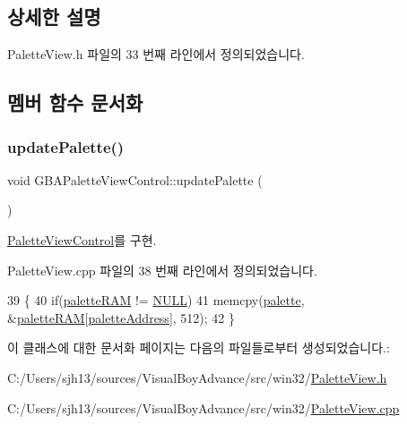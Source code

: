 \subsection{상세한 설명}


Palette\+View.\+h 파일의 33 번째 라인에서 정의되었습니다.



\subsection{멤버 함수 문서화}
\mbox{\label{class_g_b_a_palette_view_control_a020d7db2f3efb69b4e08d1b5fb351850}} 
\subsubsection{\texorpdfstring{update\+Palette()}{updatePalette()}}
{\footnotesize\ttfamily void G\+B\+A\+Palette\+View\+Control\+::update\+Palette (\begin{DoxyParamCaption}{ }\end{DoxyParamCaption})\hspace{0.3cm}{\ttfamily [virtual]}}



\mbox{\hyperlink{class_palette_view_control_a12772d59f8e890a920cb200d2f6a4b7a}{Palette\+View\+Control}}를 구현.



Palette\+View.\+cpp 파일의 38 번째 라인에서 정의되었습니다.


\begin{DoxyCode}
39 \{
40   \textcolor{keywordflow}{if}(\mbox{\hyperlink{_globals_8cpp_aea0283719ad27328f3cf5f883f58813e}{paletteRAM}} != \mbox{\hyperlink{getopt1_8c_a070d2ce7b6bb7e5c05602aa8c308d0c4}{NULL}})
41     memcpy(\mbox{\hyperlink{class_palette_view_control_a1a5ce1812cf6c8d26889f4eb03d1d4ec}{palette}}, &\mbox{\hyperlink{_globals_8cpp_aea0283719ad27328f3cf5f883f58813e}{paletteRAM}}[\mbox{\hyperlink{class_palette_view_control_a53b2efd4174e06a68e545608e458947b}{paletteAddress}}], 512);
42 \}
\end{DoxyCode}


이 클래스에 대한 문서화 페이지는 다음의 파일들로부터 생성되었습니다.\+:\begin{DoxyCompactItemize}
\item 
C\+:/\+Users/sjh13/sources/\+Visual\+Boy\+Advance/src/win32/\mbox{\hyperlink{_palette_view_8h}{Palette\+View.\+h}}\item 
C\+:/\+Users/sjh13/sources/\+Visual\+Boy\+Advance/src/win32/\mbox{\hyperlink{_palette_view_8cpp}{Palette\+View.\+cpp}}\end{DoxyCompactItemize}

